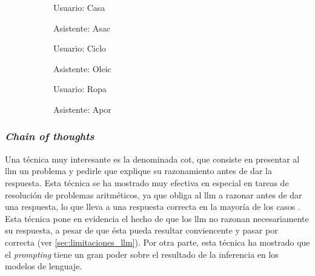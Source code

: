 \begin{figure}[H]
    \caption[Técnica de \textit{few-shot prompting}]{Técnica de \textit{few-shot prompting}. El LLM recibe como input una serie de pares <<petición-respuesta>> más una petición a la cual ha de responder de forma análoga al contexto. En este caso, el LLM, con papel de <<asistente>>, ha de devolver el input del <<usuario>> con las letras invertidas. Sin embargo, nunca se le pide explícitamente que invierta las letras, sino que lo ha de inferir a partir de los ejemplos.}
    \centering
    \begin{subfigure}{.48\textwidth}
      \centering
      \begin{mdframed}
        Usuario: Casa
        \vspace{0.1cm}

        Asistente: Asac
        \vspace{0.1cm}

        Usuario: Ciclo
        \vspace{0.1cm}

        Asistente: Oleic
        \vspace{0.1cm}

        Usuario: Ropa
        \vspace{0.2cm}
      \end{mdframed}
    \end{subfigure}\hfill

    \vspace{0.2cm}

    \begin{subfigure}{.48\textwidth}
        \centering
        \begin{mdframed}
        Asistente: Apor
        \end{mdframed}
      \end{subfigure}\hfill

      \label{fig:few_shot_prompting}
\end{figure}

\subsubsection{\textit{Chain of thoughts}}

Una técnica muy interesante es la denominada \gls{cot}, que consiste en presentar al \gls{llm} un problema y pedirle que explique su razonamiento antes de dar la respuesta. Esta técnica se ha mostrado muy efectiva en especial en tareas de resolución de problemas aritméticos, ya que obliga al \gls{llm} a razonar antes de dar una respuesta, lo que lleva a una respuesta correcta en la mayoría de los casos \citep{weiChainofThoughtPromptingElicits2023}. Esta técnica pone en evidencia el hecho de que los \gls{llm} no razonan necesariamente su respuesta, a pesar de que ésta pueda resultar conviencente y pasar por correcta (ver \ref{sec:limitaciones_llm}). Por otra parte, esta técnica ha mostrado que el \textit{prompting} tiene un gran poder sobre el resultado de la inferencia en los modelos de lenguaje. 

